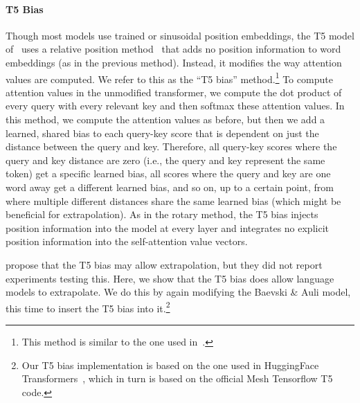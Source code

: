 \paragraph{T5 Bias}
Though most models use trained or sinusoidal position embeddings, the T5 model of~\cite{t5} uses a relative position method~\citep{shaw,Huang2019MusicTG} that adds no  position information to word embeddings (as in the previous method). Instead, it  %
modifies the way attention values are computed. We refer to this as the ``T5 bias'' method.\footnote{This method is similar to the one used in~\citet[Equation 7]{parikh-etal-2016-decomposable}.} To compute attention values in the unmodified transformer, we compute the dot product of every query with every relevant key %
and then softmax these attention values. In this method, we compute the attention values as before, %
but then we add a learned, shared bias to each query-key score that is dependent on just the distance between the query and key. Therefore, all query-key scores where the query and key distance are zero (i.e., the query and key represent the same token) get a specific learned bias, all scores where the query and key are one word away get a different learned bias, and so on, up to a certain point, from where multiple different distances share the same learned bias (which might be beneficial for extrapolation). %
As in the rotary method, the T5 bias injects position information into the model at every layer and integrates no explicit position information into the %
self-attention value vectors. 

\cite{t5} propose that the T5 bias may allow extrapolation, but they did not report experiments testing this.  Here, we show that the T5 bias does allow language models to extrapolate.
We do this by again modifying the Baevski \& Auli model, this time to insert the T5 bias into it.\footnote{Our T5 bias implementation is based on the one used in HuggingFace Transformers~\citep{huggingface}, which in turn is based on the official Mesh Tensorflow T5 code. }

